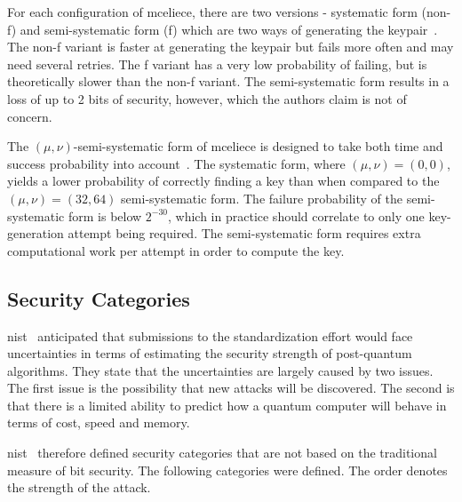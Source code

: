 For each configuration of \gls{mceliece}, there are two versions - systematic form (non-f) and semi-systematic form (f) which are two ways of generating the keypair~\cite{mceliece2020}. The non-f variant is faster at generating the keypair but fails more often and may need several retries. The f variant has a very low probability of failing, but is theoretically slower than the non-f variant. The semi-systematic form results in a loss of up to 2 bits of security, however, which the authors claim is not of concern.

The $(\mu, \nu)$-semi-systematic form of \gls{mceliece} is designed to take both time and success probability into account~\cite{mceliece2020}. The systematic form, where $(\mu, \nu)=(0, 0)$, yields a lower probability of correctly finding a key than when compared to the $(\mu, \nu)=(32,64)$ semi-systematic form. The failure probability of the semi-systematic form is below $2^{-30}$, which in practice should correlate to only one key-generation attempt being required. The semi-systematic form requires extra computational work per attempt in order to compute the key.

\subsection{Security Categories}
\label{section:background:security-categories}

\gls{nist}~\cite{nist2017} anticipated that submissions to the standardization effort would face uncertainties in terms of estimating the security strength of post-quantum algorithms. They state that the uncertainties are largely caused by two issues. The first issue is the possibility that new attacks will be discovered. The second is that there is a limited ability to predict how a quantum computer will behave in terms of cost, speed and memory.

\gls{nist}~\cite{nist2017} therefore defined security categories that are not based on the traditional measure of bit security. The following categories were defined. The order denotes the strength of the attack.

